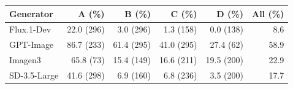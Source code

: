

\footnotesize
\begin{tabular*}{\textwidth}{@{\extracolsep{\fill}}lrrrrr}
\toprule
Generator & A (\%) & B (\%) & C (\%) & D (\%) & All (\%)\\
\midrule
Flux.1-Dev & 22.0 (296) & 3.0 (296) & 1.3 (158) & 0.0 (138) & 8.6\\
GPT-Image & 86.7 (233) & 61.4 (295) & 41.0 (295) & 27.4 (62) & 58.9\\
Imagen3 & 65.8 (73) & 15.4 (149) & 16.6 (211) & 19.5 (200) & 22.9\\
SD-3.5-Large & 41.6 (298) & 6.9 (160) & 6.8 (236) & 3.5 (200) & 17.7\\
\bottomrule
\end{tabular*}
